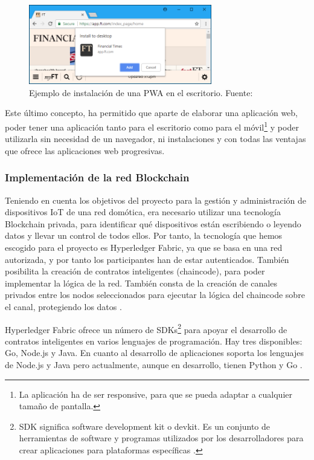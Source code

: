 \vspace{5mm}

\begin{figure}[ht!]
    \centering
    \includegraphics[width=8cm]{imagenes/herramientas/pwa-instalacion}
    \caption{Ejemplo de instalación de una PWA en el escritorio. Fuente: \cite{progressive-web-apps}}
    \label{fig:instalacion-pwa}
\end{figure}

\vspace{5mm}

\noindent Este último concepto, ha permitido que aparte de elaborar una aplicación web, poder tener una aplicación 
tanto para el escritorio como para el móvil\footnote{La aplicación ha de ser responsive, para que se pueda adaptar a 
cualquier tamaño de pantalla.\label{fnlabel}} y poder utilizarla sin necesidad de un navegador, ni instalaciones y con 
todas las ventajas que ofrece las aplicaciones web progresivas. 

\subsubsection{Implementación de la red Blockchain}

Teniendo en cuenta los objetivos del proyecto para la gestión y administración de dispositivos IoT de una red
domótica, era necesario utilizar una tecnología Blockchain privada, para identificar qué dispositivos están
escribiendo o leyendo datos y llevar un control de todos ellos. Por tanto, la tecnología que hemos escogido 
para el proyecto es Hyperledger Fabric, ya que se basa en una red autorizada, y por tanto los participantes
han de estar autenticados. También posibilita la creación de contratos inteligentes (chaincode), para poder 
implementar la lógica de la red. También consta de la creación de canales privados entre los nodos seleccionados 
para ejecutar la lógica del chaincode sobre el canal, protegiendo los datos \cite{why-hyperledger-fabric}.

\vspace{5mm}

\noindent Hyperledger Fabric ofrece un número de SDKs\footnote{SDK significa software development kit o devkit. Es un
conjunto de herramientas de software y programas utilizados por los desarrolladores para crear aplicaciones para 
plataformas específicas \cite{what-is-sdk}.\label{fnlabel}} para apoyar el desarrollo de contratos 
inteligentes en varios lenguajes de programación. Hay tres disponibles: Go, Node.js y Java. En cuanto al desarrollo 
de aplicaciones soporta los lenguajes de Node.js y Java pero actualmente, aunque en desarrollo, tienen Python y Go 
\cite{hyperledger-fabric-docs, hyperledger-fabric-nodejs-sdk}.

